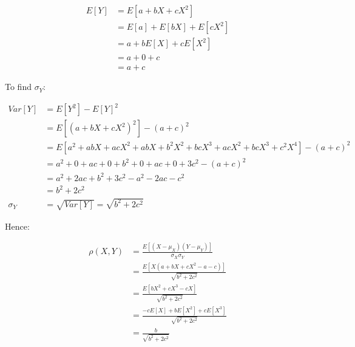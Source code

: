 \documentclass[11pt,letterpaper,titlepage]{article}
\begin{document}
\begin{enumerate}
\begin{enumerate}
        \begin{equation*}
            \begin{aligned}
            E[Y] &= E[a + b X + c X^2] \\
            &= E[a] + E[b X] + E[c X^2] \\
            &= a + b E[X] + c E[X^2] \\
            &= a + 0 + c \\
            &= a + c
            \end{aligned}
        \end{equation*}
        
        To find $ \sigma_{Y} $:
        
        \begin{equation*}
            \begin{aligned}
            Var[Y] &= E[Y^2] - E[Y]^2 \\
            &= E[(a + b X + c X^2)^2] - (a + c)^2 \\
            &= E[a^2 + a b X + a c X^2 + a b X + b^2 X^2 + b c X^3 + a c X^2 + b c X^3 + c^2 X^4] - (a + c)^2 \\
            &= a^2 + 0 + ac + 0 + b^2 + 0 + a c + 0 + 3 c^2 - (a + c)^2 \\
            &= a^2 + 2 a c + b^2 + 3 c^2 - a^2 - 2 a c - c^2 \\
            &= b^2 + 2 c^2 \\
            \sigma_{Y} &= \sqrt{Var[Y]} = \sqrt{b^2 + 2 c^2}
            \end{aligned}
        \end{equation*}
        
        Hence:
        
        \begin{equation*}
            \begin{aligned}
                \rho(X, Y) &= \frac{E[(X - \mu_{X})(Y - \mu_{Y})]}{\sigma_{X}\sigma_{Y}} \\
                &= \frac{E[X(a + b X + c X^2 - a - c)]}{\sqrt{b^2 + 2 c^2}} \\
                &= \frac{E[b X^2 + c X^3 - c X]}{\sqrt{b^2 + 2 c^2}} \\
                &= \frac{-c E[X] + b E[X^2] + c E[X^3]}{\sqrt{b^2 + 2 c^2}} \\
                &= \frac{b}{\sqrt{b^2 + 2 c^2}}
            \end{aligned}
        \end{equation*}
        
    \end{enumerate}
    
\end{enumerate}
\end{document}
